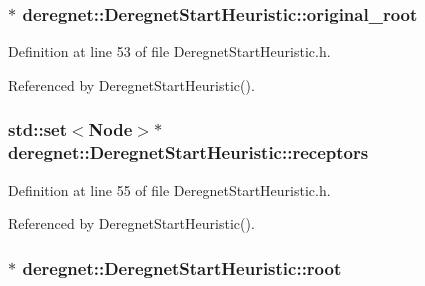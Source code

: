 \subsubsection[{\texorpdfstring{original\+\_\+root}{original_root}}]{$\ast$ deregnet\+::\+Deregnet\+Start\+Heuristic\+::original\+\_\+root\hspace{0.3cm}{\ttfamily [protected]}}\hypertarget{classderegnet_1_1DeregnetStartHeuristic_a22c9ec9b11605201c87dbac622d7618e}{}\label{classderegnet_1_1DeregnetStartHeuristic_a22c9ec9b11605201c87dbac622d7618e}


Definition at line 53 of file Deregnet\+Start\+Heuristic.\+h.



Referenced by Deregnet\+Start\+Heuristic().

\subsubsection[{\texorpdfstring{receptors}{receptors}}]{\setlength{\rightskip}{0pt plus 5cm}std\+::set$<${\bf Node}$>$$\ast$ deregnet\+::\+Deregnet\+Start\+Heuristic\+::receptors\hspace{0.3cm}{\ttfamily [protected]}}\hypertarget{classderegnet_1_1DeregnetStartHeuristic_ab80c046ff2b7c64086fceb84987b3e50}{}\label{classderegnet_1_1DeregnetStartHeuristic_ab80c046ff2b7c64086fceb84987b3e50}


Definition at line 55 of file Deregnet\+Start\+Heuristic.\+h.



Referenced by Deregnet\+Start\+Heuristic().

\subsubsection[{\texorpdfstring{root}{root}}]{$\ast$ deregnet\+::\+Deregnet\+Start\+Heuristic\+::root\hspace{0.3cm}{\ttfamily [protected]}}\hypertarget{classderegnet_1_1DeregnetStartHeuristic_a4605d41352e3adf1f9f9f32466a4e61e}{}\label{classderegnet_1_1DeregnetStartHeuristic_a4605d41352e3adf1f9f9f32466a4e61e}


